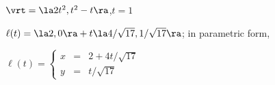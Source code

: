 {$\vrt = \la 2t^2,t^2-t \ra$,\quad $t=1$
}
{$\ell(t) = \la 2,0\ra + t\la 4/\sqrt{17},1/\sqrt{17}\ra$; in parametric form,

$\ell(t) = \left\{\begin{array}{ccc} x&=&2+4t/\sqrt{17} \\ y &=& t/\sqrt{17}\end{array}\right.$
}